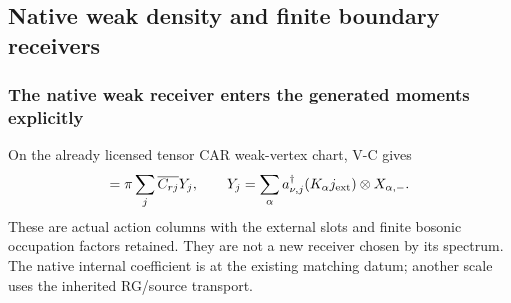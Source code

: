 \documentclass[12pt,a4paper]{article}
\begin{document}






\subsection{Native weak density and finite boundary receivers}
\label{p5c:sec:v2169-weak-density}
\subsubsection{The native weak receiver enters the generated moments explicitly}
On the already licensed tensor CAR weak-vertex chart, V-C gives
\begin{equation}
 [V_W,q_r]=\pi\sum_j\overline{C_{rj}}Y_j,\qquad
 Y_j=\sum_\alpha a_{\nu,j}^\dagger(K_\alpha j_{\rm ext})\otimes X_{\alpha,-}.
 \label{p5c:eq:v2169-b7-p11}
\end{equation}
These are actual action columns with the external slots and finite bosonic
occupation factors retained. They are not a new receiver chosen by its
spectrum. The native internal coefficient is at the existing matching datum;
another scale uses the inherited RG/source transport.
\end{document}
